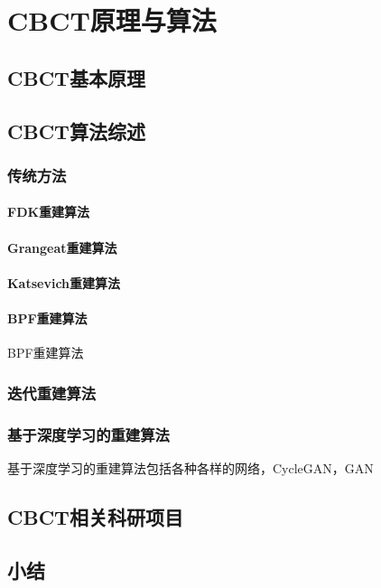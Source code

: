 

\chapter{CBCT原理与算法}

\section{CBCT基本原理}


\section{CBCT算法综述}


\subsection{传统方法}
\subsubsection{FDK重建算法}
\subsubsection{Grangeat重建算法}
\subsubsection{Katsevich重建算法}
\subsubsection{BPF重建算法}
BPF重建算法\cite{pan2004unified}
\subsection{迭代重建算法}


\subsection{基于深度学习的重建算法}
基于深度学习的重建算法包括各种各样的网络，CycleGAN\cite{liang2018generating}，GAN\cite{liao2018adversarial}


\section{CBCT相关科研项目}


\section{小结}




